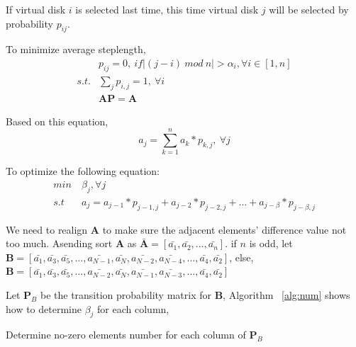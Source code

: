 \documentclass[11pt,a4paper]{article}
\begin{document}
If virtual disk $i$ is selected last time, this time virtual disk $j$ will 
be selected by probability $p_{ij}$.

To minimize average steplength, 
\begin{equation}
  \begin{split}
  & p_{ij} = 0,\ if |(j-i)\ mod \ n| > \alpha_{i}, \forall i \in [1,n] \\
  s.t. & \sum_{j} p_{i,j} = 1,\ \forall i \\
       & \mathbf{AP} = \mathbf{A}
  \end{split}
\end{equation}

Based on this equation, 
\begin{equation}
    a_{j} = \sum_{k=1}^{n} a_{k} * p_{k,j},\ \forall j
\end{equation}

To optimize the following equation:
\begin{equation}
  \begin{split}
  min\ & \beta_j, \forall j \\
  s.t\ & a_{j} = a_{j-1}*p_{j-1,j} + a_{j-2}*p_{j-2,j} + ... + a_{j-\beta}*p_{j-\beta,j}
\end{split}
\label{equ:sort}
\end{equation}

We need to realign $\mathbf{A}$ to make sure the adjacent elements' difference 
value not too much. Asending sort $\mathbf {A}$ as $\mathbf{\bar{A}} = [\bar{a_1},\bar{a_2},...,\bar{a_n}]$. 
if $n$ is odd, let $\mathbf{B} = [\bar{a_1},\bar{a_3},\bar{a_5},...,\bar{a_{N-1}},\bar{a_{N}},\bar{a_{N-2}},\bar{a_{N-4}},...,\bar{a_4},\bar{a_2}]$, 
else, $\mathbf{B} = [\bar{a_1},\bar{a_3},\bar{a_5},...,\bar{a_{N-2}},\bar{a_{N}},\bar{a_{N-1}},\bar{a_{N-3}},...,\bar{a_4},\bar{a_2}]$

Let $\mathbf{P}_B$ be the transition probability matrix for $\mathbf{B}$,
Algorithm ~\ref{alg:num} shows how to determine $\beta_j$ for each column,

\begin{algorithm}[H]
\caption{Determine no-zero elements number for each column of $\mathbf{P}_B$}
\label{alg:num}
\end{algorithm}
\end{document}
